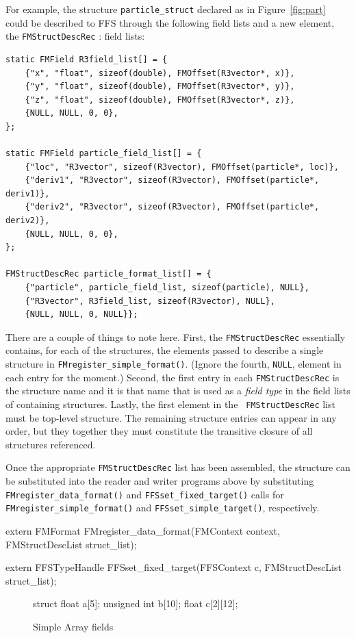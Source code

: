 For example, the structure {\tt particle\_struct} declared as in
Figure~\ref{fig:part} could be described to FFS through the following field
lists and a new element, the {\tt FMStructDescRec} :
field lists:
\begin{verbatim}
static FMField R3field_list[] = {
    {"x", "float", sizeof(double), FMOffset(R3vector*, x)},
    {"y", "float", sizeof(double), FMOffset(R3vector*, y)},
    {"z", "float", sizeof(double), FMOffset(R3vector*, z)},
    {NULL, NULL, 0, 0},
};

static FMField particle_field_list[] = {
    {"loc", "R3vector", sizeof(R3vector), FMOffset(particle*, loc)},
    {"deriv1", "R3vector", sizeof(R3vector), FMOffset(particle*, deriv1)},
    {"deriv2", "R3vector", sizeof(R3vector), FMOffset(particle*, deriv2)},
    {NULL, NULL, 0, 0},
};

FMStructDescRec particle_format_list[] = {
    {"particle", particle_field_list, sizeof(particle), NULL},
    {"R3vector", R3field_list, sizeof(R3vector), NULL},
    {NULL, NULL, 0, NULL}};

\end{verbatim}
There are a couple of things to note here.  First, the {\tt FMStructDescRec}
essentially contains, for each of the structures, the elements passed to
describe a single structure in {\tt FMregister\_simple\_format()}.  (Ignore
the fourth, {\tt NULL}, element in each entry for the moment.)  Second, the
first entry in each {\tt FMStructDescRec} is the structure name and it is
that name that is used as a {\em field type} in the field lists of
containing structures.  Lastly, the first element in the {\tt
  FMStructDescRec} list must be top-level structure.  The remaining
structure entries can appear in any order, but they together they must
constitute the transitive closure of all structures referenced.

Once the appropriate {\tt FMStructDescRec} list has been assembled, the
structure can be substituted into the reader and writer programs above by
substituting {\tt FMregister\_data\_format()} and {\tt FFSset\_fixed\_target()}
calls for {\tt FMregister\_simple\_format()} and {\tt FFSset\_simple\_target()},
respectively. 
\begin{Code}
extern FMFormat
FMregister_data_format(FMContext context, FMStructDescList struct_list);

extern FFSTypeHandle
FFSset_fixed_target(FFSContext c, FMStructDescList struct_list);
\end{Code}
\begin{figure}
\vspace*{-0.25in}
\begin{WrapCode}
struct { 
     float	a[5];
     unsigned int b[10];
     float      c[2][12];
 }
\end{WrapCode}
\caption{Simple Array fields\label{fig:array1}}
\end{figure}
